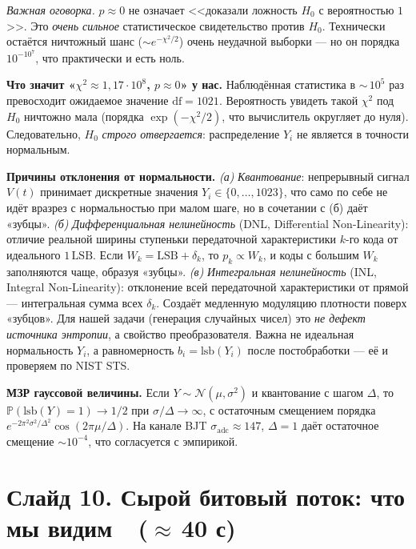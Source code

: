 \documentclass[12pt,a4paper]{extarticle}
\begin{document}
{\emph{Важная оговорка.} $p\!\approx\!0$ не означает <<доказали ложность
$H_0$ с вероятностью $1$>>. Это \emph{очень сильное} статистическое
свидетельство против $H_0$. Технически остаётся ничтожный шанс
($\sim\!e^{-\chi^2/2}$) очень неудачной выборки --- но он порядка
$10^{-10^7}$, что практически и есть ноль.

\textbf{Что значит «$\chi^2\!\approx\!1{,}17\cdot 10^8$, $p\!\approx\!0$» у нас.}
Наблюдённая статистика в ${\sim}\,10^5$ раз превосходит ожидаемое значение
$\mathrm{df}=1021$. Вероятность увидеть такой $\chi^2$ под $H_0$ ничтожно
мала (порядка $\exp(-\chi^2/2)$, что вычислитель округляет до нуля).
Следовательно, $H_0$ \emph{строго отвергается}: распределение $Y_i$
не является в точности нормальным.

\textbf{Причины отклонения от нормальности.}
\emph{(а)} \emph{Квантование}: непрерывный сигнал $V(t)$ принимает
дискретные значения $Y_i\in\{0,\ldots,1023\}$, что само по себе не идёт
вразрез с нормальностью при малом шаге, но в сочетании с (б) даёт «зубцы».
\emph{(б)} \emph{Дифференциальная нелинейность} (DNL, Differential
Non-Linearity): отличие реальной ширины ступеньки передаточной
характеристики $k$-го кода от идеального $1\,\mathrm{LSB}$. Если
$W_k=\mathrm{LSB}+\delta_k$, то $p_k\propto W_k$, и коды с большим
$W_k$ заполняются чаще, образуя «зубцы».
\emph{(в)} \emph{Интегральная нелинейность} (INL, Integral
Non-Linearity): отклонение всей передаточной характеристики от прямой ---
интегральная сумма всех $\delta_k$. Создаёт медленную модуляцию плотности
поверх «зубцов».
Для нашей задачи (генерация случайных чисел) это \emph{не дефект источника
энтропии}, а свойство преобразователя. Важна не идеальная нормальность
$Y_i$, а равномерность $b_i=\mathrm{lsb}(Y_i)$ после постобработки ---
её и проверяем по NIST STS.

\textbf{МЗР гауссовой величины.} Если $Y\sim\mathcal{N}(\mu,\sigma^2)$ и
квантование с шагом $\Delta$, то $\mathbb{P}(\mathrm{lsb}(Y)=1)\to 1/2$
при $\sigma/\Delta\to\infty$, с остаточным смещением порядка
$e^{-2\pi^2\sigma^2/\Delta^2}\cos(2\pi\mu/\Delta)$. На канале BJT
$\sigma_\mathrm{adc}\!\approx\!147$, $\Delta{=}1$ даёт остаточное смещение
$\sim 10^{-4}$, что согласуется с эмпирикой.}

\section*{Слайд 10. Сырой битовый поток: что мы видим~~($\approx$\,40 с)}
\end{document}
